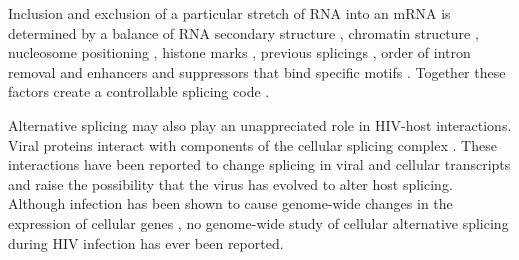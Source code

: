 \documentclass[../sherrill-Mix_thesis.tex]{subfiles}
\begin{document}




	Inclusion and exclusion of a particular stretch of RNA into an mRNA is determined by a balance of RNA secondary structure \citep{Buratti2004,Jablonski2008,Shepard2008}, chromatin structure \citep{Allo2009}, nucleosome positioning \citep{Tilgner2009}, histone marks \citep{Schwartz2009}, previous splicings \citep{Crabb2010}, order of intron removal \citep{Takahara2002,Mata2010} and enhancers \citep{Zahler1993} and suppressors \citep{Smith2000} that bind specific motifs \citep{Ule2006}. Together these factors create a controllable splicing code \citep{Barash2010,Xiong2011,Witten2011}.  

	Alternative splicing may also play an unappreciated role in HIV-host interactions. Viral proteins interact with components of the cellular splicing complex \citep{Tange1996,Berro2006,Jager2012}. These interactions have been reported to change splicing in viral \citep{Berro2006,Bohne2007,Jablonski2010} and cellular transcripts \citep{Kuramitsu2005,Hashizume2007} and raise the possibility that the virus has evolved to alter host splicing. Although infection has been shown to cause genome-wide changes in the expression of cellular genes \citep{Vahey2002,Wout2003,Mitchell2003,Rotger2010,Chang2011}, no genome-wide study of cellular alternative splicing during HIV infection has ever been reported.
\end{document}
